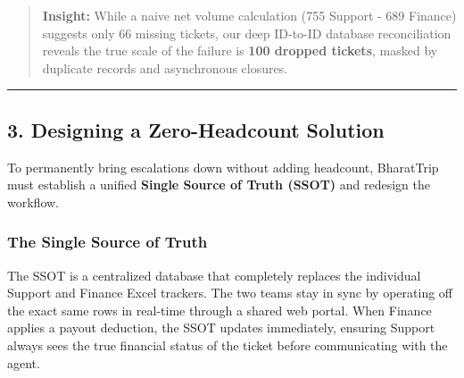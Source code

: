 \documentclass[
]{article}
\begin{document}
\begin{quote}
\textbf{Insight:} While a naive net volume calculation (755 Support - 689 Finance) suggests only 66 missing tickets, our deep ID-to-ID database reconciliation reveals the true scale of the failure is \textbf{100 dropped tickets}, masked by duplicate records and asynchronous closures.
\end{quote}

\begin{center}\rule{0.5\linewidth}{0.5pt}\end{center}

\subsection{3. Designing a Zero-Headcount Solution}\label{designing-a-zero-headcount-solution}

To permanently bring escalations down without adding headcount, BharatTrip must establish a unified \textbf{Single Source of Truth (SSOT)} and redesign the workflow.

\subsubsection{The Single Source of Truth}\label{the-single-source-of-truth}
The SSOT is a centralized database that completely replaces the individual Support and Finance Excel trackers. The two teams stay in sync by operating off the exact same rows in real-time through a shared web portal. When Finance applies a payout deduction, the SSOT updates immediately, ensuring Support always sees the true financial status of the ticket before communicating with the agent.
\end{document}
